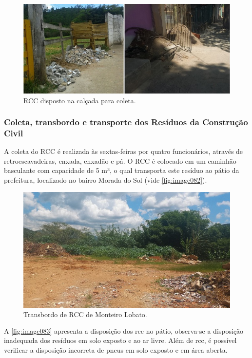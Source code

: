 \begin{figure}
	\centering
	\includegraphics[width=0.75\linewidth]{produtos/prodtres/image081}
	\caption{RCC disposto na calçada para coleta.}
	\label{fig:image081}
\end{figure}


\subsubsection{Coleta, transbordo e transporte dos Resíduos da Construção Civil}
A coleta do RCC é realizada às sextas-feiras por quatro funcionários, através de retroescavadeiras, enxada, enxadão e pá. O RCC é colocado em um caminhão basculante com capacidade de 5 m³, o qual transporta este resíduo ao pátio da prefeitura, localizado no bairro Morada do Sol (vide \autoref{fig:image082}).

\begin{figure}
	\centering
	\includegraphics[width=0.7\linewidth]{produtos/prodtres/image082}
	\caption{Transbordo de RCC de Monteiro Lobato.}
	\label{fig:image082}
\end{figure}


A \autoref{fig:image083} apresenta a disposição dos \gls{rcc} no pátio, observa-se a disposição inadequada dos resíduos em solo exposto e ao ar livre. Além de \gls{rcc}, é possível verificar a disposição incorreta de pneus em solo exposto e em área aberta.

